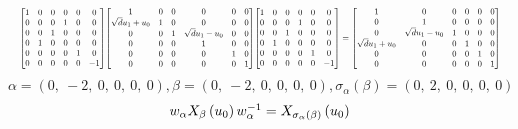 \documentclass[11pt]{article}
\theoremstyle{definition}
\begin{document}
\[
\scaletoalign{\textwidth}{{\left[\begin{matrix}1 & 0 & 0 & 0 & 0 & 0\\0 & 0 & 0 & 1 & 0 & 0\\0 & 0 & 1 & 0 & 0 & 0\\0 & 1 & 0 & 0 & 0 & 0\\0 & 0 & 0 & 0 & 1 & 0\\0 & 0 & 0 & 0 & 0 & -1\end{matrix}\right]} {\left[\begin{matrix}1 & 0 & 0 & 0 & 0 & 0\\\sqrt{d} u_{1} + u_{0} & 1 & 0 & 0 & 0 & 0\\0 & 0 & 1 & \sqrt{d} u_{1} - u_{0} & 0 & 0\\0 & 0 & 0 & 1 & 0 & 0\\0 & 0 & 0 & 0 & 1 & 0\\0 & 0 & 0 & 0 & 0 & 1\end{matrix}\right]} {\left[\begin{matrix}1 & 0 & 0 & 0 & 0 & 0\\0 & 0 & 0 & 1 & 0 & 0\\0 & 0 & 1 & 0 & 0 & 0\\0 & 1 & 0 & 0 & 0 & 0\\0 & 0 & 0 & 0 & 1 & 0\\0 & 0 & 0 & 0 & 0 & -1\end{matrix}\right]} = {\left[\begin{matrix}1 & 0 & 0 & 0 & 0 & 0\\0 & 1 & 0 & 0 & 0 & 0\\0 & \sqrt{d} u_{1} - u_{0} & 1 & 0 & 0 & 0\\\sqrt{d} u_{1} + u_{0} & 0 & 0 & 1 & 0 & 0\\0 & 0 & 0 & 0 & 1 & 0\\0 & 0 & 0 & 0 & 0 & 1\end{matrix}\right]}}
\]
\[
\alpha = \left( 0, \  -2, \  0, \  0, \  0, \  0\right), \beta = \left( 0, \  -2, \  0, \  0, \  0, \  0\right), \sigma_{\alpha}(\beta) = \left( 0, \  2, \  0, \  0, \  0, \  0\right)
\]
\[
\scaletoalign{\textwidth}{w_{\alpha} X_{\beta}\left(u_{0}\right) w_{\alpha}^{-1} = X_{\sigma_{\alpha}\left(\beta\right)}\left(u_{0}\right)}
\]
\end{document}
